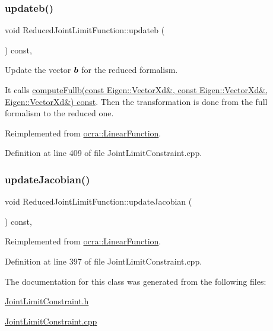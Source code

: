\subsubsection{\texorpdfstring{updateb()}{updateb()}}
{\footnotesize\ttfamily void Reduced\+Joint\+Limit\+Function\+::updateb (\begin{DoxyParamCaption}{ }\end{DoxyParamCaption}) const\hspace{0.3cm}{\ttfamily [protected]}, {\ttfamily [virtual]}}

Update the vector $ \mbox{\boldmath${b}$} $ for the reduced formalism.

It calls \hyperlink{classocra_1_1JointLimitFunction_a254ef5b5095410a802976c95f04fe0a4}{compute\+Fullb(const Eigen\+::\+Vector\+Xd\&, const Eigen\+::\+Vector\+Xd\&, Eigen\+::\+Vector\+Xd\&) const}. Then the transformation is done from the full formalism to the reduced one. 

Reimplemented from \hyperlink{classocra_1_1LinearFunction_a546454cd8d0909f99433ffc0e700c9e3}{ocra\+::\+Linear\+Function}.



Definition at line 409 of file Joint\+Limit\+Constraint.\+cpp.

\hypertarget{classocra_1_1ReducedJointLimitFunction_a3b2b65be504eda131ad8d00304304fd3}{}\label{classocra_1_1ReducedJointLimitFunction_a3b2b65be504eda131ad8d00304304fd3} 
\subsubsection{\texorpdfstring{update\+Jacobian()}{updateJacobian()}}
{\footnotesize\ttfamily void Reduced\+Joint\+Limit\+Function\+::update\+Jacobian (\begin{DoxyParamCaption}{ }\end{DoxyParamCaption}) const\hspace{0.3cm}{\ttfamily [protected]}, {\ttfamily [virtual]}}



Reimplemented from \hyperlink{classocra_1_1LinearFunction_a30926f977c0124a0b0f65b854ab39636}{ocra\+::\+Linear\+Function}.



Definition at line 397 of file Joint\+Limit\+Constraint.\+cpp.



The documentation for this class was generated from the following files\+:\begin{DoxyCompactItemize}
\item 
\hyperlink{JointLimitConstraint_8h}{Joint\+Limit\+Constraint.\+h}\item 
\hyperlink{JointLimitConstraint_8cpp}{Joint\+Limit\+Constraint.\+cpp}\end{DoxyCompactItemize}
